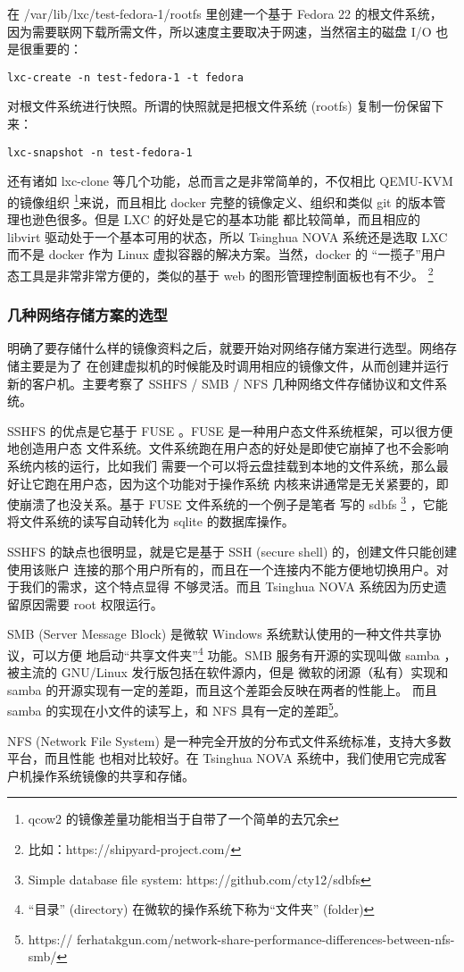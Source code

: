 在 /var/lib/lxc/test-fedora-1/rootfs 里创建一个基于 Fedora 22 的根文件系统，
因为需要联网下载所需文件，所以速度主要取决于网速，当然宿主的磁盘 I/O 也是很重要的：

\begin{lstlisting}
lxc-create -n test-fedora-1 -t fedora
\end{lstlisting}

对根文件系统进行快照。所谓的快照就是把根文件系统 (rootfs) 复制一份保留下来：

\begin{lstlisting}
lxc-snapshot -n test-fedora-1
\end{lstlisting}

还有诸如 lxc-clone 等几个功能，总而言之是非常简单的，不仅相比 QEMU-KVM 的镜像组织
\footnote{qcow2 的镜像差量功能相当于自带了一个简单的去冗余}来说，而且相比 docker
完整的镜像定义、组织和类似 git 的版本管理也逊色很多。但是 LXC 的好处是它的基本功能
都比较简单，而且相应的 libvirt 驱动处于一个基本可用的状态，所以 Tsinghua NOVA
系统还是选取 LXC 而不是 docker 作为 Linux 虚拟容器的解决方案。当然，docker 的
“一揽子”用户态工具是非常非常方便的，类似的基于 web 的图形管理控制面板也有不少。
\footnote{比如：https://shipyard-project.com/}

\subsubsection{几种网络存储方案的选型}

明确了要存储什么样的镜像资料之后，就要开始对网络存储方案进行选型。网络存储主要是为了
在创建虚拟机的时候能及时调用相应的镜像文件，从而创建并运行新的客户机。主要考察了
SSHFS / SMB / NFS 几种网络文件存储协议和文件系统。

SSHFS 的优点是它基于 FUSE 。FUSE 是一种用户态文件系统框架，可以很方便地创造用户态
文件系统。文件系统跑在用户态的好处是即使它崩掉了也不会影响系统内核的运行，比如我们
需要一个可以将云盘挂载到本地的文件系统，那么最好让它跑在用户态，因为这个功能对于操作系统
内核来讲通常是无关紧要的，即使崩溃了也没关系。基于 FUSE 文件系统的一个例子是笔者
写的 sdbfs \footnote{Simple database file system:
https://github.com/cty12/sdbfs} ，它能将文件系统的读写自动转化为 sqlite 的数据库操作。

SSHFS 的缺点也很明显，就是它是基于 SSH (secure shell) 的，创建文件只能创建使用该账户
连接的那个用户所有的，而且在一个连接内不能方便地切换用户。对于我们的需求，这个特点显得
不够灵活。而且 Tsinghua NOVA 系统因为历史遗留原因需要 root 权限运行。

SMB (Server Message Block) 是微软 Windows 系统默认使用的一种文件共享协议，可以方便
地启动“共享文件夹”\footnote{“目录” (directory) 在微软的操作系统下称为“文件夹” (folder)}
功能。SMB 服务有开源的实现叫做 samba ，被主流的 GNU/Linux 发行版包括在软件源内，但是
微软的闭源（私有）实现和 samba 的开源实现有一定的差距，而且这个差距会反映在两者的性能上。
而且 samba 的实现在小文件的读写上，和 NFS 具有一定的差距\footnote{https://
ferhatakgun.com/network-share-performance-differences-between-nfs-smb/}。

NFS (Network File System) 是一种完全开放的分布式文件系统标准，支持大多数平台，而且性能
也相对比较好。在 Tsinghua NOVA 系统中，我们使用它完成客户机操作系统镜像的共享和存储。
